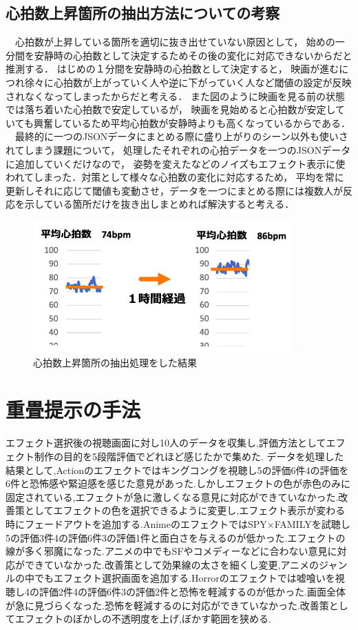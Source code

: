 \subsection{心拍数上昇箇所の抽出方法についての考察}
　心拍数が上昇している箇所を適切に抜き出せていない原因として，
始めの一分間を安静時の心拍数として決定するためその後の変化に対応できないからだと推測する．
はじめの１分間を安静時の心拍数として決定すると，
映画が進むにつれ徐々に心拍数が上がっていく人や逆に下がっていく人など閾値の設定が反映されなくなってしまったからだと考える．
また図のように映画を見る前の状態では落ち着いた心拍数で安定しているが，
映画を見始めると心拍数が安定していても興奮しているため平均心拍数が安静時よりも高くなっているからである．
　最終的に一つのJSONデータにまとめる際に盛り上がりのシーン以外も使いされてしまう課題について，
処理したそれぞれの心拍データを一つのJSONデータに追加していくだけなので，
姿勢を変えたなどのノイズもエフェクト表示に使われてしまった．対策として様々な心拍数の変化に対応するため，
平均を常に更新しそれに応じて閾値も変動させ，データを一つにまとめる際には複数人が反応を示している箇所だけを抜き出しまとめれば解決すると考える． 

\begin{figure}[H]
    \centering
    \includegraphics[width=10cm]{images/chapter4/bpmave.png}
    \caption{心拍数上昇箇所の抽出処理をした結果}
\end{figure}

\section{重畳提示の手法}
エフェクト選択後の視聴画面に対し10人のデータを収集し,評価方法としてエフェクト制作の目的を5段階評価でどれほど感じたかで集めた.
データを処理した結果として,Actionのエフェクトではキングコングを視聴し5の評価6件4の評価を6件と恐怖感や緊迫感を感じた意見があった.しかしエフェクトの色が赤色のみに固定されている,エフェクトが急に激しくなる意見に対応ができていなかった.改善策としてエフェクトの色を選択できるように変更し,エフェクト表示が変わる時にフェードアウトを追加する.AnimeのエフェクトではSPY×FAMILYを試聴し5の評価3件4の評価6件3の評価1件と面白さを与えるのが低かった.エフェクトの線が多く邪魔になった.アニメの中でもSFやコメディーなどに合わない意見に対応ができていなかった.改善策として効果線の太さを細くし変更,アニメのジャンルの中でもエフェクト選択画面を追加する.Horrorのエフェクトでは嘘喰いを視聴し4の評価2件4の評価6件3の評価2件と恐怖を軽減するのが低かった.画面全体が急に見づらくなった.恐怖を軽減するのに対応ができていなかった.改善策としてエフェクトのぼかしの不透明度を上げ,ぼかす範囲を狭める.


